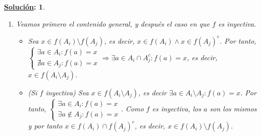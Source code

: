 \documentclass[10pt,a4paper,openright]{book}
\theoremstyle{break}
\newtheorem*{sol}{\underline{Solución}:}
\begin{document}
\begin{sol}
\begin{enumerate}[label={(\arabic*)}]
\begin{enumerate}[label={(\alph*)}]
\begin{itemize}
 \item (Si $f$ inyectiva) Sea $x \in \bigcap_i f( A_i)$. Entonces, $\forall i \in I : x \in f(A_i)$. Entonces, $\forall i \in I \ \exists a \in A_i : f(a) = x \Rightarrow \exists a \in \bigcap_i A_i : f(a) = x$, y como la $f$ es inyectiva, $x \in f(\bigcap_i A_i)$.
 \end{itemize}
 \item  Veamos primero el contenido general, y después el caso en que $f$ es inyectiva.
 \begin{itemize}
 \item Sea $x \in f(A_i) \setminus f(A_j)$, es decir, $x \in f(A_i) \wedge x \in f(A_j)^c$. Por tanto, $\begin{cases} \exists a \in A_i : f(a) = x \\ \nexists a \in A_j : f(a) = x  \end{cases}\Rightarrow \exists a \in A_i \cap A_j^c : f(a) = x$, es decir, $x \in f(A_i \setminus A_j)$.
 \item (Si $f$ inyectiva) Sea $x \in f(A_i \setminus A_j)$, es decir $\exists a \in A_i \setminus A_j : f(a)=x$. Por tanto, $\begin{cases} \exists a \in A_i : f(a) = x \\ \exists a \notin A_j : f(a) = x  \end{cases}$. Como $f$ es inyectiva, los $a$ son los mismos y por tanto $x \in f(A_i) \cap f(A_j)^c$, es decir, $x \in f(A_i) \setminus f(A_j)$.
 \end{itemize}
 \end{enumerate}
\end{enumerate}
\end{sol}
\end{document}
